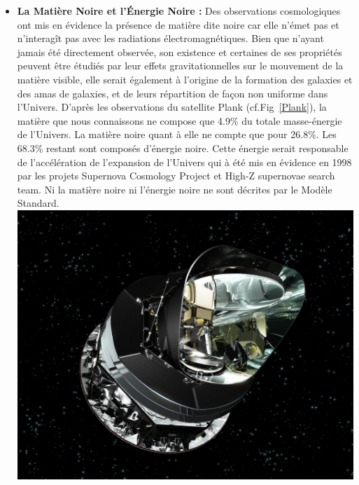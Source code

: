 \begin{itemize}[label=$\bullet$]
\item \textbf{La Matière Noire et l'Énergie Noire :} Des observations cosmologiques ont mis en évidence la présence de matière dite noire car elle n'émet pas et n'interagît pas avec les radiations électromagnétiques. Bien que n'ayant jamais été directement observée, son existence et certaines de ses propriétés peuvent être étudiés par leur effets gravitationnelles sur le mouvement de la matière visible, elle serait  également à l'origine de la formation des galaxies et des amas de galaxies, et de leurs répartition de façon non uniforme dans l'Univers. D'après les observations du satellite Plank (cf.Fig~\ref{Plank}), la matière que nous connaissons ne compose que \num{4.9}\% du totale masse-énergie de l'Univers. La matière noire quant à elle ne compte que pour \num{26.8}\%. Les \num{68.3}\% restant sont composés d'énergie noire. Cette énergie serait responsable de l'accélération de l'expansion de l'Univers qui à été mis en évidence en \num{1998} par les projets Supernova Cosmology Project et High-Z supernovae search team. Ni la matière noire ni l'énergie noire ne sont décrites par le Modèle Standard.
\marginpar
{
\centering
\includegraphics[width=\marginparwidth]{SM/plank.jpg}
\label{Plank}
} 


\end{itemize}
